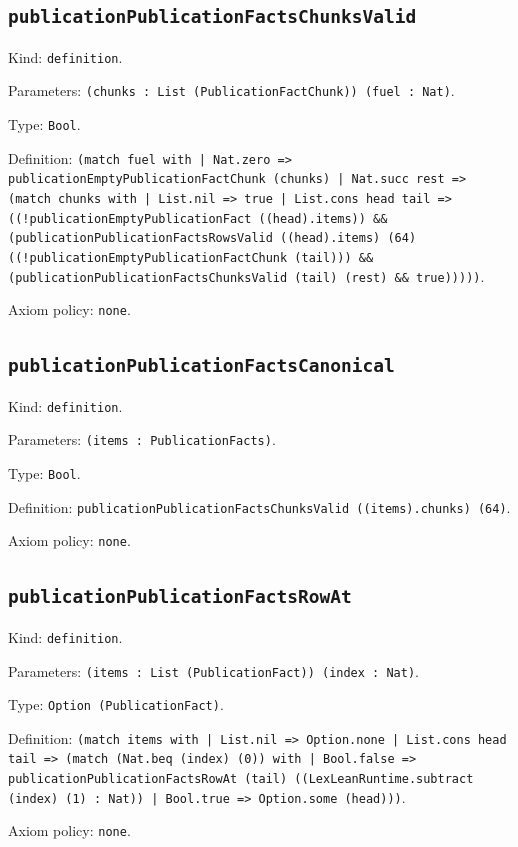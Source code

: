 \documentclass[11pt]{article}
\begin{document}
\subsection*{\texttt{publicationPublicationFactsChunksValid}}
\noindent Kind: \texttt{definition}.\par
\noindent Parameters: \texttt{(chunks : List (PublicationFactChunk)) (fuel : Nat)}.\par
\noindent Type: \texttt{Bool}.\par
\noindent Definition: \texttt{(match fuel with | Nat.zero => publicationEmptyPublicationFactChunk (chunks) | Nat.succ rest => (match chunks with | List.nil => true | List.cons head tail => ((!publicationEmptyPublicationFact ((head).items)) \&\& (publicationPublicationFactsRowsValid ((head).items) (64) ((!publicationEmptyPublicationFactChunk (tail))) \&\& (publicationPublicationFactsChunksValid (tail) (rest) \&\& true)))))}.\par
\noindent Axiom policy: \texttt{none}.\par
\subsection*{\texttt{publicationPublicationFactsCanonical}}
\noindent Kind: \texttt{definition}.\par
\noindent Parameters: \texttt{(items : PublicationFacts)}.\par
\noindent Type: \texttt{Bool}.\par
\noindent Definition: \texttt{publicationPublicationFactsChunksValid ((items).chunks) (64)}.\par
\noindent Axiom policy: \texttt{none}.\par
\subsection*{\texttt{publicationPublicationFactsRowAt}}
\noindent Kind: \texttt{definition}.\par
\noindent Parameters: \texttt{(items : List (PublicationFact)) (index : Nat)}.\par
\noindent Type: \texttt{Option (PublicationFact)}.\par
\noindent Definition: \texttt{(match items with | List.nil => Option.none | List.cons head tail => (match (Nat.beq (index) (0)) with | Bool.false => publicationPublicationFactsRowAt (tail) ((LexLeanRuntime.subtract (index) (1) : Nat)) | Bool.true => Option.some (head)))}.\par
\noindent Axiom policy: \texttt{none}.\par
\end{document}
